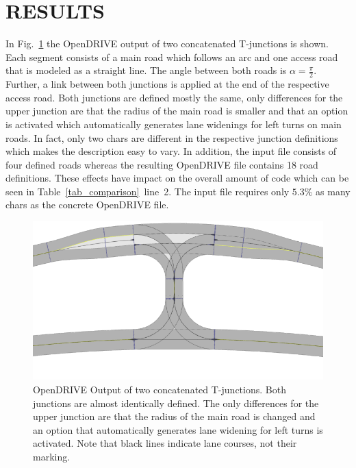 \documentclass[a4paper, 10pt, conference]{ieeeconf}      %
\begin{document}
\section{RESULTS}
In Fig.~\ref{fig_res3_2} the OpenDRIVE output of two concatenated T-junctions is shown. Each segment consists of a main road which follows an arc and one access road that is modeled as a straight line. The angle between both roads is $\alpha=\frac{\pi}{2}$. Further, a link between both junctions is applied at the end of the respective access road. Both junctions are defined mostly the same, only differences for the upper junction are that the radius of the main road is smaller and that an option is activated which automatically generates lane widenings for left turns on main roads. In fact, only two chars are different in the respective junction definitions which makes the description easy to vary. In addition, the input file consists of four defined roads whereas the resulting OpenDRIVE file contains 18 road definitions. These effects have impact on the overall amount of code which can be seen in Table~\ref{tab_comparison}~line~2. The input file requires only $5.3\%$ as many chars as the concrete OpenDRIVE file.
\begin{figure}[thpb]
	\includegraphics[width=\columnwidth]{fig/res3_2.png}
	\caption{OpenDRIVE Output of two concatenated T-junctions. Both junctions are almost identically defined. The only differences for the upper junction are that the radius of the main road is changed and an option that automatically generates lane widening for left turns is activated. Note that black lines indicate lane courses, not their marking.}
	\label{fig_res3_2}
\end{figure}
\end{document}
